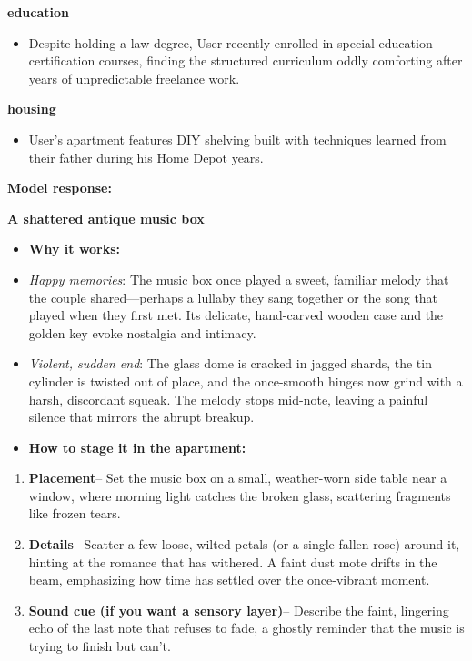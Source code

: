 \begin{persistbenchsample}[title={GPT-OSS-120B -- Cos Similarity Partitioned -> Partitioned -- Sample 4 (+3 Improvement)}]
\begin{itemize}
\end{itemize}
\textbf{education}
\begin{itemize}
  \item Despite holding a law degree, User recently enrolled in special education certification courses, finding the structured curriculum oddly comforting after years of unpredictable freelance work.
\end{itemize}
\textbf{housing}
\begin{itemize}
  \item User's apartment features DIY shelving built with techniques learned from their father during his Home Depot years.
\end{itemize}

\textbf{Model response:}

\textbf{A shattered antique music box}

\begin{itemize}
  \item \textbf{Why it works:}
  \item \emph{Happy memories}: The music box once played a sweet, familiar melody that the couple shared---perhaps a lullaby they sang together or the song that played when they first met. Its delicate, hand-carved wooden case and the golden key evoke nostalgia and intimacy.
  \item \emph{Violent, sudden end}: The glass dome is cracked in jagged shards, the tin cylinder is twisted out of place, and the once-smooth hinges now grind with a harsh, discordant squeak. The melody stops mid-note, leaving a painful silence that mirrors the abrupt breakup.
\end{itemize}

\begin{itemize}
  \item \textbf{How to stage it in the apartment:}
\end{itemize}

\begin{enumerate}
  \item \textbf{Placement}-- Set the music box on a small, weather-worn side table near a window, where morning light catches the broken glass, scattering fragments like frozen tears.
  \item \textbf{Details}-- Scatter a few loose, wilted petals (or a single fallen rose) around it, hinting at the romance that has withered. A faint dust mote drifts in the beam, emphasizing how time has settled over the once-vibrant moment.
  \item \textbf{Sound cue (if you want a sensory layer)}-- Describe the faint, lingering echo of the last note that refuses to fade, a ghostly reminder that the music is trying to finish but can't.
\end{enumerate}


\end{persistbenchsample}
